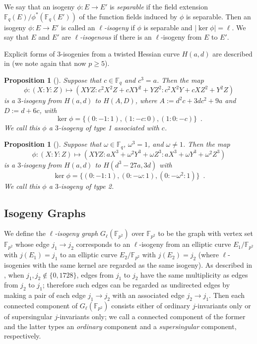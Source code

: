\documentclass{article}
\newtheorem{proposition}[theorem]{Proposition}
\theoremstyle{definition}
\newcommand{\FF}{\mathbb{F}}
\begin{document}
We say that an isogeny $\phi \colon E \to E'$ is \emph{separable} if the field extension $\FF_q(E) / \phi^*(\FF_q(E'))$ of the function fields induced by $\phi$ is separable.
Then an isogeny $\phi \colon E \to E'$ is called an \emph{$\ell$-isogeny} if $\phi$ is separable and $|\ker \phi| = \ell$.
We say that $E$ and $E'$ are \emph{$\ell$-isogenous} if there is an $\ell$-isogeny from $E$ to $E'$.

Explicit forms of $3$-isogenies from a twisted Hessian curve $H(a,d)$ are described in \cite{perez2021isogenies} (we note again that now $p \geq 5$).

\begin{proposition}
[{\cite[Theorem 3]{perez2021isogenies}}]
\label{prop:3-isogeny_Hesse_type1}
Suppose that $c \in \FF_q$ and $c^3 = a$.
Then the map
\[
\phi \colon (X:Y:Z) \mapsto ( XYZ : c^2 X^2 Z + c X Y^2 + Y Z^2 : c^2 X^2 Y + c X Z^2 + Y^2 Z )
\]
is a $3$-isogeny from $H(a,d)$ to $H(A,D)$, where $A := d^2 c + 3dc^2 + 9a$ and $D := d + 6c$, with
\[
\ker \phi = \{ (0:-1:1), (1:-c:0), (1:0:-c) \} \enspace.
\]
We call this $\phi$ a $3$-isogeny of \emph{type 1} associated with $c$.
\end{proposition}

\begin{proposition}
[{\cite[Theorem 1]{perez2021isogenies}}]
\label{prop:3-isogeny_Hesse_type2}
Suppose that $\omega \in \FF_q$, $\omega^3 = 1$, and $\omega \neq 1$.
Then the map
\[
\phi \colon (X:Y:Z) \mapsto ( XYZ : aX^3 + \omega^2 Y^3 + \omega Z^3 : aX^3 + \omega Y^3 + \omega^2 Z^3)
\]
is a $3$-isogeny from $H(a,d)$ to $H(d^3 - 27a, 3d)$ with
\[
\ker \phi = \{ (0:-1:1), (0:-\omega:1), (0:-\omega^2:1) \} \enspace.
\]
We call this $\phi$ a $3$-isogeny of \emph{type 2}.
\end{proposition}


\subsection{Isogeny Graphs}
\label{sec:preliminaries:isogeny_graphs}

We define the \emph{$\ell$-isogeny graph} $G_{\ell}(\FF_{p^2})$ over $\FF_{p^2}$ to be the graph with vertex set $\FF_{p^2}$ whose edge $j_1 \to j_2$ corresponds to an $\ell$-isogeny from an elliptic curve $E_1/\FF_{p^2}$ with $j(E_1) = j_1$ to an elliptic curve $E_2/\FF_{p^2}$ with $j(E_2) = j_2$ (where $\ell$-isogenies with the same kernel are regarded as the same isogeny).
As described in \cite{Sutherland:ANTSX}, when $j_1,j_2 \not\in \{0,1728\}$, edges from $j_1$ to $j_2$ have the same multiplicity as edges from $j_2$ to $j_1$; therefore such edges can be regarded as undirected edges by making a pair of each edge $j_1 \to j_2$ with an associated edge $j_2 \to j_1$.
Then each connected component of $G_{\ell}(\FF_{p^2})$ consists either of ordinary $j$-invariants only or of supersingular $j$-invariants only; we call a connected component of the former and the latter types an \emph{ordinary} component and a \emph{supersingular} component, respectively.
\end{document}
